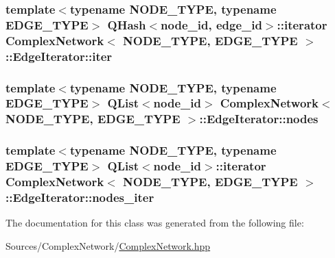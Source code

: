 \hypertarget{class_complex_network_1_1_edge_iterator_aec1de93d958a15dbb9ee5c142a18f271}{
\subsubsection[{iter}]{\setlength{\rightskip}{0pt plus 5cm}template$<$typename N\+O\+D\+E\+\_\+\+T\+Y\+P\+E, typename E\+D\+G\+E\+\_\+\+T\+Y\+P\+E$>$ Q\+Hash$<${\bf node\+\_\+id}, {\bf edge\+\_\+id}$>$\+::iterator {\bf Complex\+Network}$<$ N\+O\+D\+E\+\_\+\+T\+Y\+P\+E, E\+D\+G\+E\+\_\+\+T\+Y\+P\+E $>$\+::Edge\+Iterator\+::iter\hspace{0.3cm}{\ttfamily [private]}}}\label{class_complex_network_1_1_edge_iterator_aec1de93d958a15dbb9ee5c142a18f271}
\hypertarget{class_complex_network_1_1_edge_iterator_a964117946288427210f941e78c93f4b7}{
\subsubsection[{nodes}]{\setlength{\rightskip}{0pt plus 5cm}template$<$typename N\+O\+D\+E\+\_\+\+T\+Y\+P\+E, typename E\+D\+G\+E\+\_\+\+T\+Y\+P\+E$>$ Q\+List$<${\bf node\+\_\+id}$>$ {\bf Complex\+Network}$<$ N\+O\+D\+E\+\_\+\+T\+Y\+P\+E, E\+D\+G\+E\+\_\+\+T\+Y\+P\+E $>$\+::Edge\+Iterator\+::nodes\hspace{0.3cm}{\ttfamily [private]}}}\label{class_complex_network_1_1_edge_iterator_a964117946288427210f941e78c93f4b7}
\hypertarget{class_complex_network_1_1_edge_iterator_a4bf6c92361c1c0d0b8eb273e81a163f5}{
\subsubsection[{nodes\+\_\+iter}]{\setlength{\rightskip}{0pt plus 5cm}template$<$typename N\+O\+D\+E\+\_\+\+T\+Y\+P\+E, typename E\+D\+G\+E\+\_\+\+T\+Y\+P\+E$>$ Q\+List$<${\bf node\+\_\+id}$>$\+::iterator {\bf Complex\+Network}$<$ N\+O\+D\+E\+\_\+\+T\+Y\+P\+E, E\+D\+G\+E\+\_\+\+T\+Y\+P\+E $>$\+::Edge\+Iterator\+::nodes\+\_\+iter\hspace{0.3cm}{\ttfamily [private]}}}\label{class_complex_network_1_1_edge_iterator_a4bf6c92361c1c0d0b8eb273e81a163f5}


The documentation for this class was generated from the following file\+:\begin{DoxyCompactItemize}
\item 
Sources/\+Complex\+Network/\hyperlink{_complex_network_8hpp}{Complex\+Network.\+hpp}\end{DoxyCompactItemize}
